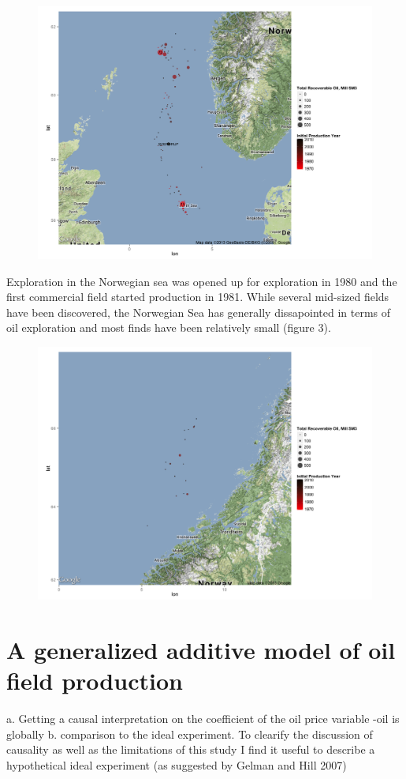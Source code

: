 \documentclass[12pt]{scrartcl} %
\begin{document}
\begin{figure}
\includegraphics[width=1\textwidth]{north_sea_reserves.png}
\end{figure}

Exploration in the Norwegian sea was opened up for exploration in 1980 and the first commercial field started production in 1981.  While several mid-sized fields have been discovered, the Norwegian Sea has generally dissapointed in terms of oil exploration and most finds have been relatively small (figure 3).  


\begin{figure}
\includegraphics[width=1\textwidth]{norwegian_sea_reserves.png}
\end{figure}

\section{A generalized additive model of oil field production}
	a. Getting a causal interpretation on the coefficient of the oil price variable
		-oil is globally 
	b. comparison to the ideal experiment.  
	To clearify the discussion of causality as well as the limitations of this study I find it useful to describe a hypothetical ideal experiment (as suggested by Gelman and Hill 2007)



\end{document}
